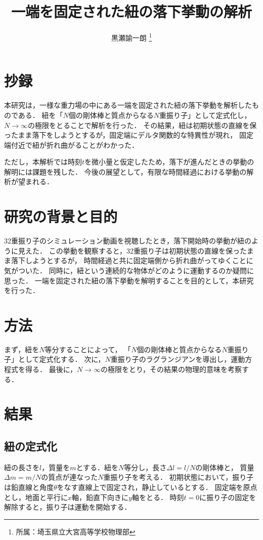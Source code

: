 \documentclass[]{jlreq}
\begin{document}
\title{一端を固定された紐の落下挙動の解析}
\author{黒瀬諭一朗 \thanks{所属：埼玉県立大宮高等学校物理部}}
\maketitle



\section{抄録}
本研究は，一様な重力場の中にある一端を固定された紐の落下挙動を解析したものである．
紐を「$N$個の剛体棒と質点からなる$N$重振り子」として定式化し，
$N\rightarrow\infty$の極限をとることで解析を行った．
その結果，紐は初期状態の直線を保ったまま落下をしようとするが，固定端にデルタ関数的な特異性が現れ，
固定端付近で紐が折れ曲がることがわかった．

ただし，本解析では時刻$t$を微小量と仮定したため，落下が進んだときの挙動の解明には課題を残した．
今後の展望として，有限な時間経過における挙動の解析が望まれる．


\section{研究の背景と目的}
32重振り子のシミュレーション動画を視聴したとき，落下開始時の挙動が紐のように見えた．
この挙動を観察すると，32重振り子は初期状態の直線を保ったまま落下しようとするが，
時間経過と共に固定端側から折れ曲がってゆくことに気がついた．
同時に，紐という連続的な物体がどのように運動するのか疑問に思った．
一端を固定された紐の落下挙動を解明することを目的として，本研究を行った．



\section{方法}
まず，紐を$N$等分することによって，
「$N$個の剛体棒と質点からなる$N$重振り子」として定式化する．
次に，$N$重振り子のラグランジアンを導出し，運動方程式を得る．
最後に，$N\rightarrow\infty$の極限をとり，その結果の物理的意味を考察する．



\section{結果}
\subsection{紐の定式化}
紐の長さを$l$，質量を$m$とする．紐を$N$等分し，長さ$\varDelta l = l/N$の剛体棒と，
質量$\varDelta m = m/N$の質点が連なった$N$重振り子を考える．
初期状態において，振り子は鉛直線と角度$\theta$をなす直線上で固定され，静止しているとする．
固定端を原点とし，地面と平行に$x$軸，鉛直下向きに$y$軸をとる．
時刻$t = 0$に振り子の固定を解除すると，振り子は運動を開始する．
\end{document}
